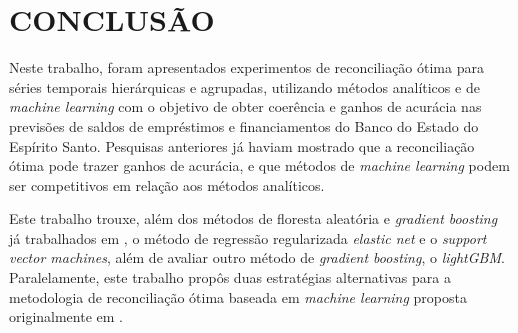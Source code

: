 \documentclass[
  12pt,
  twoside,
  openright,
  a4paper,
  chapter=TITLE,
  section=TITLE,
  brazil]{abntex2}
\begin{document}
\begin{table}

\caption{\label{tbl-tourism-tempo-ml}Resultados Tourism: Tempo de
processamento dos métodos de ML (em horas)}


\end{table}%

\section{CONCLUSÃO}\label{conclusuxe3o}

Neste trabalho, foram apresentados experimentos de reconciliação ótima
para séries temporais hierárquicas e agrupadas, utilizando métodos
analíticos e de \emph{machine learning} com o objetivo de obter
coerência e ganhos de acurácia nas previsões de saldos de empréstimos e
financiamentos do Banco do Estado do Espírito Santo. Pesquisas
anteriores já haviam mostrado que a reconciliação ótima pode trazer
ganhos de acurácia, e que métodos de \emph{machine learning} podem ser
competitivos em relação aos métodos analíticos.

Este trabalho trouxe, além dos métodos de floresta aleatória e
\emph{gradient boosting} já trabalhados em
\textcite{spiliotis_hierarchical_2021}, o método de regressão
regularizada \emph{elastic net} e o \emph{support vector machines}, além
de avaliar outro método de \emph{gradient boosting}, o \emph{lightGBM}.
Paralelamente, este trabalho propôs duas estratégias alternativas para a
metodologia de reconciliação ótima baseada em \emph{machine learning}
proposta originalmente em \textcite{spiliotis_hierarchical_2021}.
\end{document}
